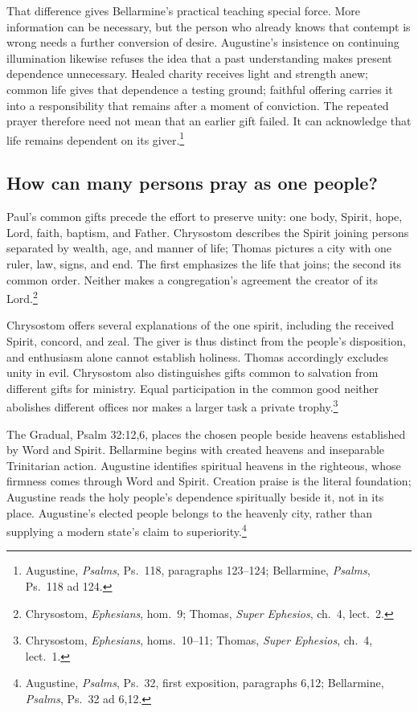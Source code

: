 That difference gives Bellarmine's practical teaching special force. More information can be necessary, but the person who already knows that contempt is wrong needs a further conversion of desire. Augustine's insistence on continuing illumination likewise refuses the idea that a past understanding makes present dependence unnecessary. Healed charity receives light and strength anew; common life gives that dependence a testing ground; faithful offering carries it into a responsibility that remains after a moment of conviction. The repeated prayer therefore need not mean that an earlier gift failed. It can acknowledge that life remains dependent on its giver.\footnote{Augustine, \textit{Psalms}, Ps.~118, paragraphs 123--124; Bellarmine, \textit{Psalms}, Ps.~118 ad 124.}

\subsection{How can many persons pray as one people?}

Paul's common gifts precede the effort to preserve unity: one body, Spirit, hope, Lord, faith, baptism, and Father. Chrysostom describes the Spirit joining persons separated by wealth, age, and manner of life; Thomas pictures a city with one ruler, law, signs, and end. The first emphasizes the life that joins; the second its common order. Neither makes a congregation's agreement the creator of its Lord.\footnote{Chrysostom, \textit{Ephesians}, hom.~9; Thomas, \textit{Super Ephesios}, ch.~4, lect.~2.}

Chrysostom offers several explanations of the one spirit, including the received Spirit, concord, and zeal. The giver is thus distinct from the people's disposition, and enthusiasm alone cannot establish holiness. Thomas accordingly excludes unity in evil. Chrysostom also distinguishes gifts common to salvation from different gifts for ministry. Equal participation in the common good neither abolishes different offices nor makes a larger task a private trophy.\footnote{Chrysostom, \textit{Ephesians}, homs.~10--11; Thomas, \textit{Super Ephesios}, ch.~4, lect.~1.}

The Gradual, Psalm 32:12,6, places the chosen people beside heavens established by Word and Spirit. Bellarmine begins with created heavens and inseparable Trinitarian action. Augustine identifies spiritual heavens in the righteous, whose firmness comes through Word and Spirit. Creation praise is the literal foundation; Augustine reads the holy people's dependence spiritually beside it, not in its place. Augustine's elected people belongs to the heavenly city, rather than supplying a modern state's claim to superiority.\footnote{Augustine, \textit{Psalms}, Ps.~32, first exposition, paragraphs 6,12; Bellarmine, \textit{Psalms}, Ps.~32 ad 6,12.}

